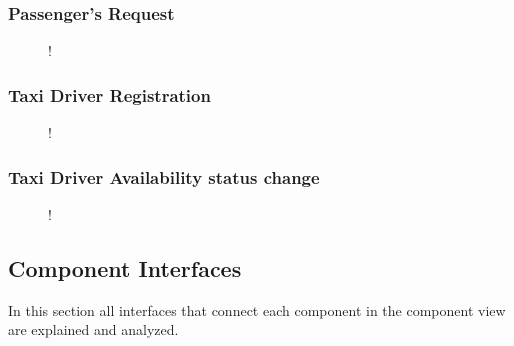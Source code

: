 \subsubsection{Passenger's Request}
\begin{figure}[H]
	\small
	\centering
	\resizebox{6in}
	{!}{}
\end{figure}
\subsubsection{Taxi Driver Registration}
\begin{figure}[H]
	\small
	\centering
	\resizebox{6in}
	{!}{}
\end{figure}
\subsubsection{Taxi Driver Availability status change}
\begin{figure}[H]
	\small
	\centering
	\resizebox{6in}
	{!}{}
\end{figure}
\subsection{Component Interfaces}
In this section all interfaces that connect each component in the component view are explained and analyzed.
